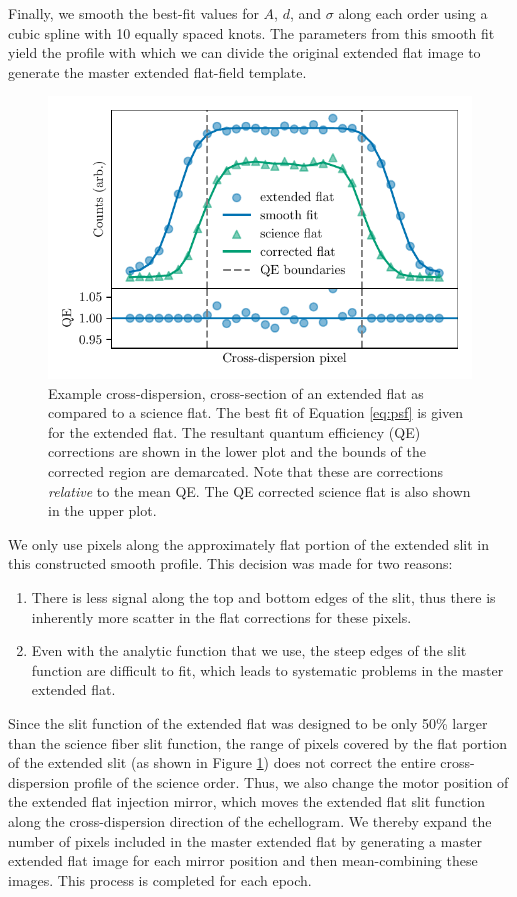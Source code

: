 Finally, we smooth the best-fit values for $A$, $d$, and $\sigma$ along each order using a cubic spline with 10 equally spaced knots. The parameters from this smooth fit yield the profile with which we can divide the original extended flat image to generate the master extended flat-field template.

\begin{figure}
\centering
\includegraphics{figures-4/flats}
\caption{Example cross-dispersion, cross-section of an extended flat as compared to a science flat. The best fit of Equation \ref{eq:psf} is given for the extended flat. The resultant quantum efficiency (QE) corrections are shown in the lower plot and the bounds of the corrected region are demarcated. Note that these are corrections \textit{relative} to the mean QE. The QE corrected science flat is also shown in the upper plot.}\label{fig:flats}
\end{figure}

We only use pixels along the approximately flat portion of the extended slit in this constructed smooth profile. This decision was made for two reasons:
\begin{enumerate}
    \item There is less signal along the top and bottom edges of the slit, thus there is inherently more scatter in the flat corrections for these pixels.
    \item Even with the analytic function that we use, the steep edges of the slit function are difficult to fit, which leads to systematic problems in the master extended flat.
\end{enumerate}
Since the slit function of the extended flat was designed to be only 50\% larger than the science fiber slit function, the range of pixels covered by the flat portion of the extended slit (as shown in Figure \ref{fig:flats}) does not correct the entire cross-dispersion profile of the science order. Thus, we also change the motor position of the extended flat injection mirror, which moves the extended flat slit function along the cross-dispersion direction of the echellogram. We thereby expand the number of pixels included in the master extended flat by generating a master extended flat image for each mirror position and then mean-combining these images. This process is completed for each epoch.

